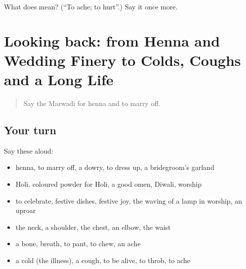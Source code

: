 \begin{tcolorbox}[breakable,colback=teal!4,colframe=teal!35!black,title={Before you move on}]
What does  mean? (\textquotedblleft{}To ache; to hurt\textquotedblright{}.) Say it once more.
\end{tcolorbox}
\section[(dialogue)]{Looking back: from Henna and Wedding Finery to Colds, Coughs and a Long Life}

\label{lesson:MW-R253-review-248-253}



\begin{quote}
Say the Marwadi for henna and to marry off.
\end{quote}

\subsection*{Your turn}
Say these aloud:

\begin{itemize}
\raggedright
  \item henna, to marry off, a dowry, to dress up, a bridegroom's garland
  \item Holi, coloured powder for Holi, a good omen, Diwali, worship
  \item to celebrate, festive dishes, festive joy, the waving of a lamp in worship, an uproar
  \item the neck, a shoulder, the chest, an elbow, the waist
  \item a bone, breath, to pant, to chew, an ache
  \item a cold (the illness), a cough, to be alive, to throb, to ache
\end{itemize}

